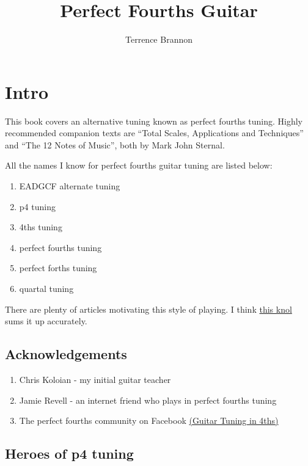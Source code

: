 \documentclass[12pt]{report}
\begin{document}
\title{Perfect Fourths Guitar}
\author{Terrence Brannon}
\maketitle


\tableofcontents

\chapter{Intro}

This book covers an alternative tuning known as perfect fourths
tuning. Highly recommended companion texts are ``Total Scales,
Applications and Techniques'' and ``The 12 Notes of Music'', both by
Mark John Sternal.

All the names I know for perfect fourths guitar tuning are listed
below: 

\begin{enumerate}
\item EADGCF alternate tuning
\item p4 tuning
\item 4ths tuning
\item perfect fourths tuning
\item perfect forths tuning
\item quartal tuning
\end{enumerate}

There are plenty of articles motivating this style of playing. I think
\href{http://knol.google.com/k/guitar-tuning-in-fourths#}{this knol}
sums it up accurately.

\section{Acknowledgements}

\begin{enumerate}
\item Chris Koloian - my initial guitar teacher
\item Jamie Revell - an internet friend who plays in perfect fourths
  tuning 
\item The perfect fourths community on Facebook
  \href{http://www.facebook.com/#!/group.php?gid=183968224067}{(Guitar
    Tuning in 4ths)}

\end{enumerate}

\section{Heroes of p4 tuning}
\end{document}
